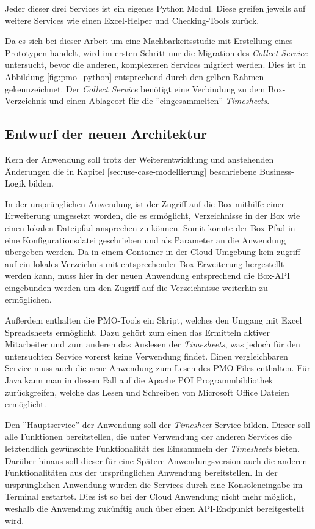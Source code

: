 Jeder dieser drei Services ist ein eigenes Python Modul. Diese greifen jeweils auf weitere Services wie einen Excel-Helper und Checking-Tools zurück.

Da es sich bei dieser Arbeit um eine Machbarkeitsstudie mit Erstellung eines Prototypen handelt, wird im ersten Schritt nur die Migration des \textit{Collect Service} untersucht, bevor die anderen, komplexeren Services migriert werden. Dies ist in Abbildung \ref{fig:pmo_python} entsprechend durch den gelben Rahmen gekennzeichnet. Der \textit{Collect Service} benötigt eine Verbindung zu dem \gls{Box}-Verzeichnis und einen Ablageort für die ''eingesammelten'' \textit{\glspl{Timesheet}}.
\pagebreak

\subsection{Entwurf der neuen Architektur}
Kern der Anwendung soll trotz der Weiterentwicklung und anstehenden Änderungen die in Kapitel \ref{sec:use-case-modellierung} beschriebene Business-Logik bilden.

In der ursprünglichen Anwendung ist der Zugriff auf die \gls{Box} mithilfe einer Erweiterung umgesetzt worden, die es ermöglicht, Verzeichnisse in der \gls{Box} wie einen lokalen Dateipfad ansprechen zu können. Somit konnte der Box-Pfad in eine Konfigurationsdatei geschrieben und als Parameter an die Anwendung übergeben werden. Da in einem Container in der Cloud Umgebung kein zugriff auf ein lokales Verzeichnis mit entsprechender \gls{Box}-Erweiterung hergestellt werden kann, muss hier in der neuen Anwendung entsprechend die \gls{Box}-\ac{API} eingebunden werden um den Zugriff auf die Verzeichnisse weiterhin zu ermöglichen.

Außerdem enthalten die PMO-Tools ein Skript, welches den Umgang mit Excel Spreadsheets ermöglicht. Dazu gehört zum einen das Ermitteln aktiver Mitarbeiter und zum anderen das Auslesen der \textit{\glspl{Timesheet}}, was jedoch für den untersuchten Service vorerst keine Verwendung findet. Einen vergleichbaren Service muss auch die neue Anwendung zum Lesen des PMO-Files enthalten. Für Java kann man in diesem Fall auf die Apache POI Programmbibliothek zurückgreifen, welche das Lesen und Schreiben von Microsoft Office Dateien ermöglicht.

Den ''Hauptservice'' der Anwendung soll der \textit{\gls{Timesheet}}-Service bilden. Dieser soll alle Funktionen bereitstellen, die unter Verwendung der anderen Services die letztendlich gewünschte Funktionalität des Einsammeln der \textit{\glspl{Timesheet}} bieten. Darüber hinaus soll dieser für eine Spätere Anwendungsversion auch die anderen Funktionalitäten aus der ursprünglichen Anwendung bereitstellen. In der ursprünglichen Anwendung wurden die Services durch eine Konsoleneingabe im Terminal gestartet. Dies ist so bei der Cloud Anwendung nicht mehr möglich, weshalb die Anwendung zukünftig auch über einen \ac{API}-Endpunkt bereitgestellt wird. \pagebreak

